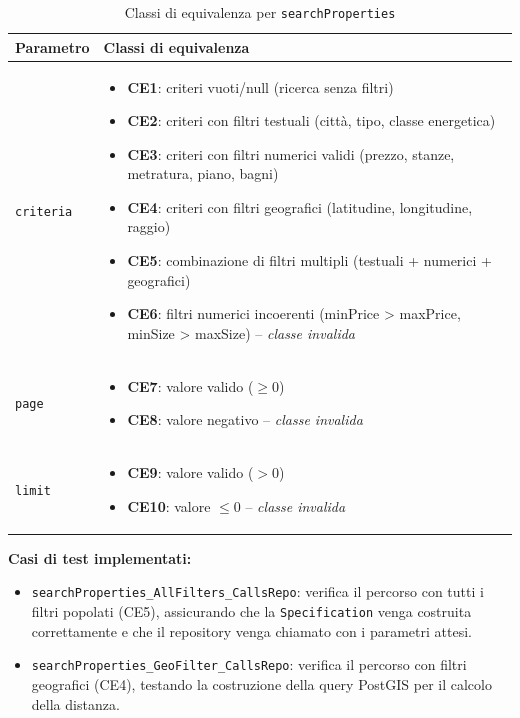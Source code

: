 \documentclass[a4paper,11pt]{report}
\begin{document}
\begin{table}[H]
\centering
\small
\renewcommand{\arraystretch}{1.3}
\begin{tabularx}{\textwidth}{|l|X|}
\toprule
\textbf{Parametro} & \textbf{Classi di equivalenza} \\
\midrule
\texttt{criteria} & 
\begin{itemize}[nosep, leftmargin=*]
  \item \textbf{CE1}: criteri vuoti/null (ricerca senza filtri)
  \item \textbf{CE2}: criteri con filtri testuali (città, tipo, classe energetica)
  \item \textbf{CE3}: criteri con filtri numerici validi (prezzo, stanze, metratura, piano, bagni)
  \item \textbf{CE4}: criteri con filtri geografici (latitudine, longitudine, raggio)
  \item \textbf{CE5}: combinazione di filtri multipli (testuali + numerici + geografici)
  \item \textbf{CE6}: filtri numerici incoerenti (minPrice > maxPrice, minSize > maxSize) -- \emph{classe invalida}
\end{itemize} \\
\midrule
\texttt{page} & 
\begin{itemize}[nosep, leftmargin=*]
  \item \textbf{CE7}: valore valido (\(\geq 0\))
  \item \textbf{CE8}: valore negativo -- \emph{classe invalida}
\end{itemize} \\
\midrule
\texttt{limit} & 
\begin{itemize}[nosep, leftmargin=*]
  \item \textbf{CE9}: valore valido (\(> 0\))
  \item \textbf{CE10}: valore \(\leq 0\) -- \emph{classe invalida}
\end{itemize} \\
\bottomrule
\end{tabularx}
\caption{Classi di equivalenza per \texttt{searchProperties}}
\end{table}

\textbf{Casi di test implementati:}

\begin{itemize}[nosep]
  \item \texttt{searchProperties\_AllFilters\_CallsRepo}: verifica il percorso con tutti i filtri popolati (CE5), assicurando che la \texttt{Specification} venga costruita correttamente e che il repository venga chiamato con i parametri attesi.
  \item \texttt{searchProperties\_GeoFilter\_CallsRepo}: verifica il percorso con filtri geografici (CE4), testando la costruzione della query PostGIS per il calcolo della distanza.
\end{itemize}
\end{document}
